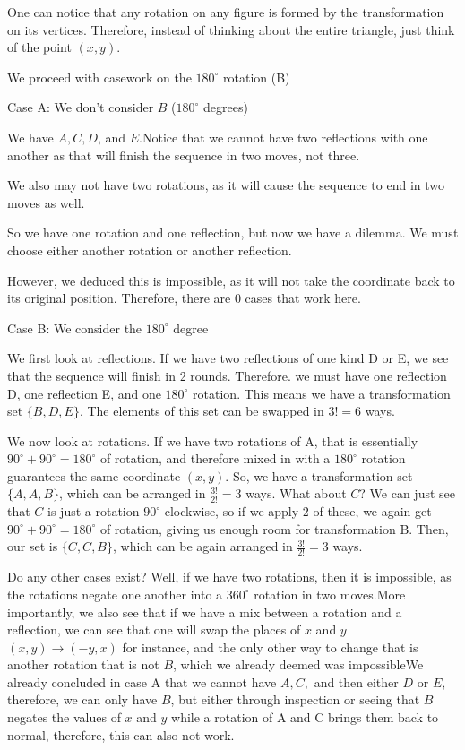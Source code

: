 \begin{enumerate}
 One can notice that any rotation on any figure is formed by the transformation on its vertices. Therefore, instead of thinking about the entire triangle, just think of the point \( (x, y) \).

 We proceed with casework on the \( 180^\circ \) rotation (B)

 Case A: We don't consider \( B \) (\( 180^\circ \) degrees)

 We have \( A, C, D \), and \( E \).Notice that we cannot have two reflections with one another as that will finish the sequence in two moves, not three.

 We also may not have two rotations, as it will cause the sequence to end in two moves as well.

 So we have one rotation and one reflection, but now we have a dilemma. We must choose either another rotation or another reflection.

 However, we deduced this is impossible, as it will not take the coordinate back to its original position. Therefore, there are 0 cases that work here.

 Case B: We consider the \( 180^\circ \) degree

 We first look at reflections. If we have two reflections of one kind D or E, we see that the sequence will finish in 2 rounds. Therefore. we must have one reflection D, one reflection E, and one \( 180^\circ \) rotation. This means we have a transformation set \( \{B, D, E\} \). The elements of this set can be swapped in \( 3! = 6 \) ways.

 We now look at rotations. If we have two rotations of A, that is essentially \( 90^\circ + 90^\circ = 180^\circ \) of rotation, and therefore mixed in with a \( 180^\circ \) rotation guarantees the same coordinate \( (x, y) \). So, we have a transformation set \( \{A, A, B\} \), which can be arranged in \( \frac{3!}{2!} = 3 \) ways. What about \( C \)? We can just see that \( C \) is just a rotation \( 90^\circ \) clockwise, so if we apply 2 of these, we again get \( 90^\circ + 90^\circ = 180^\circ \) of rotation, giving us enough room for transformation B. Then, our set is \( \{C, C, B\} \), which can be again arranged in \( \frac{3!}{2!} = 3 \) ways.

 Do any other cases exist? Well, if we have two rotations, then it is impossible, as the rotations negate one another into a \( 360^\circ \) rotation in two moves.More importantly, we also see that if we have a mix between a rotation and a reflection, we can see that one will swap the places of \( x \) and \( y \) \( (x, y) \rightarrow (-y, x) \) for instance, and the only other way to change that is another rotation that is not \( B \), which we already deemed was impossibleWe already concluded in case A that we cannot have \( A, C, \) and then either \( D \) or \( E \), therefore, we can only have \( B \), but either through inspection or seeing that \( B \) negates the values of \( x \) and \( y \) while a rotation of A and C brings them back to normal, therefore, this can also not work.


\end{enumerate}
